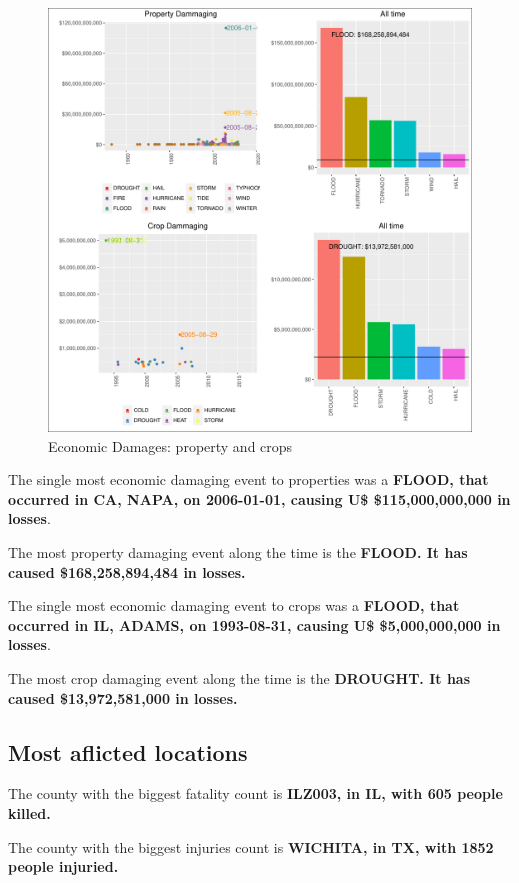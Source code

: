 \documentclass[]{article}
\begin{document}
\begin{figure}[h!]
\centering
\includegraphics{readme_files/figure-latex/economic-plot-1.pdf}
\caption{Economic Damages: property and crops}
\end{figure}

The single most economic damaging event to properties was a
\textbf{FLOOD, that occurred in CA, NAPA, on 2006-01-01, causing U\$
\$115,000,000,000 in losses}.

The most property damaging event along the time is the \textbf{FLOOD. It
has caused \$168,258,894,484 in losses.}

The single most economic damaging event to crops was a \textbf{FLOOD,
that occurred in IL, ADAMS, on 1993-08-31, causing U\$ \$5,000,000,000
in losses}.

The most crop damaging event along the time is the \textbf{DROUGHT. It
has caused \$13,972,581,000 in losses.}

\subsection{Most aflicted locations}\label{most-aflicted-locations-1}

The county with the biggest fatality count is \textbf{ILZ003, in IL,
with 605 people killed.}

The county with the biggest injuries count is \textbf{WICHITA, in TX,
with 1852 people injuried.}
\end{document}
